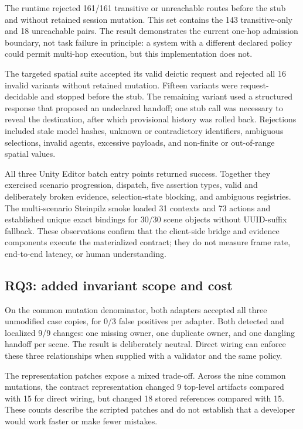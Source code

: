The runtime rejected 161/161 transitive or unreachable routes before the stub
and without retained session mutation.  This set contains the 143
transitive-only and 18 unreachable pairs.  The result demonstrates the current
one-hop admission boundary, not task failure in principle: a system with a
different declared policy could permit multi-hop execution, but this
implementation does not.

The targeted spatial suite accepted its valid deictic request and rejected all
16 invalid variants without retained mutation.  Fifteen variants were
request-decidable and stopped before the stub.  The remaining variant used a
structured response that proposed an undeclared handoff; one stub call was
necessary to reveal the destination, after which provisional history was
rolled back.  Rejections included stale model hashes, unknown or contradictory
identifiers, ambiguous selections, invalid agents, excessive payloads, and
non-finite or out-of-range spatial values.

All three Unity Editor batch entry points returned success.  Together they
exercised scenario progression, dispatch, five assertion types, valid and
deliberately broken evidence, selection-state blocking, and ambiguous
registries.  The multi-scenario Steinpilz smoke loaded 31 contexts and 73
actions and established unique exact bindings for 30/30 scene objects without
UUID-suffix fallback.  These observations confirm that the client-side bridge
and evidence components execute the materialized contract; they do not measure
frame rate, end-to-end latency, or human understanding.

\subsection{RQ3: added invariant scope and cost}

On the common mutation denominator, both adapters accepted all three unmodified
case copies, for 0/3 false positives per adapter.  Both detected and localized
9/9 changes: one missing owner, one duplicate owner, and one dangling handoff
per scene.  The result is deliberately neutral.  Direct wiring can enforce
these three relationships when supplied with a validator and the same policy.

The representation patches expose a mixed trade-off.  Across the nine common
mutations, the contract representation changed 9 top-level artifacts compared
with 15 for direct wiring, but changed 18 stored references compared with 15.
These counts describe the scripted patches and do not establish that a
developer would work faster or make fewer mistakes.

